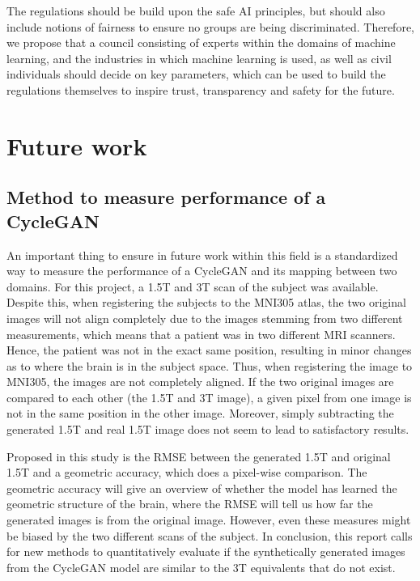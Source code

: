 \documentclass[11pt, fleqn, titlepage]{article}
\newcommand{\1}[1]{\mathds{1}\left[#1\right]}
\begin{document}
The regulations should be build upon the safe AI principles, but should also include notions of fairness to ensure no groups are being discriminated. Therefore, we propose that a council consisting of experts within the domains of machine learning, and the industries in which machine learning is used, as well as civil individuals should decide on key parameters, which can be used to build the regulations themselves to inspire trust, transparency and safety for the future. 

\section{Future work} \label{future_work}


\subsection{Method to measure performance of a CycleGAN}\label{fture_work_measure}
An important thing to ensure in future work within this field is a standardized way to measure the performance of a CycleGAN and its mapping between two domains. For this project, a 1.5T and 3T scan of the subject was available. Despite this, when registering the subjects to the MNI305 atlas, the two original images will not align completely due to the images stemming from two different measurements, which means that a patient was in two different MRI scanners. Hence, the patient was not in the exact same position, resulting in minor changes as to where the brain is in the subject space. Thus, when registering the image to MNI305, the images are not completely aligned. If the two original images are compared to each other (the 1.5T and 3T image), a given pixel from one image is not in the same position in the other image. Moreover, simply subtracting the generated 1.5T and real 1.5T image does not seem to lead to satisfactory results.

Proposed in this study is the RMSE between the generated 1.5T and original 1.5T and a geometric accuracy, which does a pixel-wise comparison. The geometric accuracy will give an overview of whether the model has learned the geometric structure of the brain, where the RMSE will tell us how far the generated images is from the original image. However, even these measures might be biased by the two different scans of the subject. In conclusion, this report calls for new methods to quantitatively evaluate if the synthetically generated images from the CycleGAN model are similar to the 3T equivalents that do not exist. 
\end{document}
